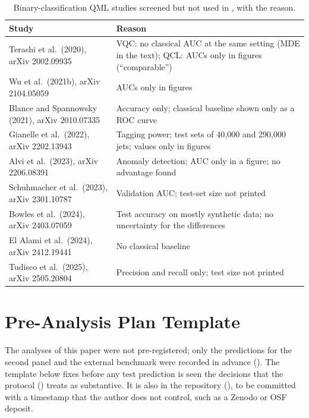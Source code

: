 \documentclass[11pt,a4paper]{article}
\begin{document}
\begin{table}[htbp]
\centering
\caption{Binary-classification QML studies screened but not used in , with the reason.}
\label{tab:literature_screened}
{\small
\begin{tabularx}{\textwidth}{@{}>{\raggedright\arraybackslash}p{5.2cm}X@{}}
\toprule
\textbf{Study} & \textbf{Reason} \\
\midrule
Terashi et al.\ (2020), arXiv 2002.09935 & VQC: no classical AUC at the same setting (MDE in the text); QCL: AUCs only in figures (``comparable'') \\
Wu et al.\ (2021b), arXiv 2104.05059 & AUCs only in figures \\
Blance and Spannowsky (2021), arXiv 2010.07335 & Accuracy only; classical baseline shown only as a ROC curve \\
Gianelle et al.\ (2022), arXiv 2202.13943 & Tagging power; test sets of 40{,}000 and 290{,}000 jets; values only in figures \\
Alvi et al.\ (2023), arXiv 2206.08391 & Anomaly detection; AUC only in a figure; no advantage found \\
Schuhmacher et al.\ (2023), arXiv 2301.10787 & Validation AUC; test-set size not printed \\
Bowles et al.\ (2024), arXiv 2403.07059 & Test accuracy on mostly synthetic data; no uncertainty for the differences \\
El Alami et al.\ (2024), arXiv 2412.19441 & No classical baseline \\
Tudisco et al.\ (2025), arXiv 2505.20804 & Precision and recall only; test size not printed \\
\bottomrule
\end{tabularx}}
\end{table}

\section{Pre-Analysis Plan Template}
\label{app:pap}

The analyses of this paper were not pre-registered; only the predictions for the second panel and the external benchmark were recorded in advance (). The template below fixes before any test prediction is seen the decisions that the protocol () treats as substantive. It is also in the repository (), to be committed with a timestamp that the author does not control, such as a Zenodo or OSF deposit.
\end{document}
